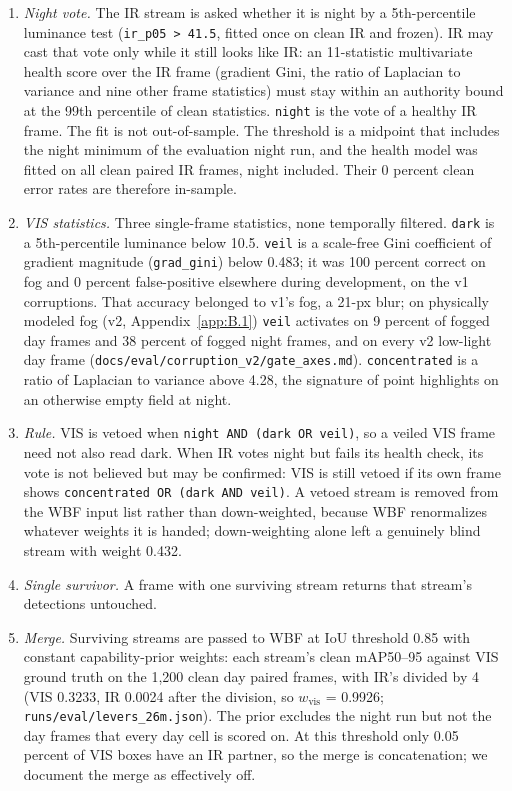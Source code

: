 \documentclass[10pt]{article}
\begin{document}
\begin{enumerate}
\item \emph{Night vote.} The IR stream is asked whether it is night by a 5th-percentile luminance test (\texttt{ir\_\allowbreak{}p05 > 41.5}, fitted once on clean IR and frozen). IR may cast that vote only while it still looks like IR: an 11-statistic multivariate health score over the IR frame (gradient Gini, the ratio of Laplacian to variance and nine other frame statistics) must stay within an authority bound at the 99th percentile of clean statistics. \texttt{night} is the vote of a healthy IR frame. The fit is not out-of-sample. The threshold is a midpoint that includes the night minimum of the evaluation night run, and the health model was fitted on all clean paired IR frames, night included. Their 0 percent clean error rates are therefore in-sample.
\item \emph{VIS statistics.} Three single-frame statistics, none temporally filtered. \texttt{dark} is a 5th-percentile luminance below 10.5. \texttt{veil} is a scale-free Gini coefficient of gradient magnitude (\texttt{grad\_\allowbreak{}gini}) below 0.483; it was 100 percent correct on fog and 0 percent false-positive elsewhere during development, on the v1 corruptions. That accuracy belonged to v1's fog, a 21-px blur; on physically modeled fog (v2, Appendix~\ref{app:B.1}) \texttt{veil} activates on 9 percent of fogged day frames and 38 percent of fogged night frames, and on every v2 low-light day frame (\texttt{docs/\allowbreak{}eval/\allowbreak{}corruption\_\allowbreak{}v2/\allowbreak{}gate\_\allowbreak{}axes.md}). \texttt{concentrated} is a ratio of Laplacian to variance above 4.28, the signature of point highlights on an otherwise empty field at night.
\item \emph{Rule.} VIS is vetoed when \texttt{night AND (dark OR veil)}, so a veiled VIS frame need not also read dark. When IR votes night but fails its health check, its vote is not believed but may be confirmed: VIS is still vetoed if its own frame shows \texttt{concentrated OR (dark AND veil)}. A vetoed stream is removed from the WBF input list rather than down-weighted, because WBF renormalizes whatever weights it is handed; down-weighting alone left a genuinely blind stream with weight 0.432.
\item \emph{Single survivor.} A frame with one surviving stream returns that stream's detections untouched.
\item \emph{Merge.} Surviving streams are passed to WBF at IoU threshold 0.85 with constant capability-prior weights: each stream's clean mAP50--95 against VIS ground truth on the 1,200 clean day paired frames, with IR's divided by 4 (VIS 0.3233, IR 0.0024 after the division, so $w_{\mathrm{vis}}$ = 0.9926; \texttt{runs/\allowbreak{}eval/\allowbreak{}levers\_\allowbreak{}26m.json}). The prior excludes the night run but not the day frames that every day cell is scored on. At this threshold only 0.05 percent of VIS boxes have an IR partner, so the merge is concatenation; we document the merge as effectively off.

\end{enumerate}
\end{document}
